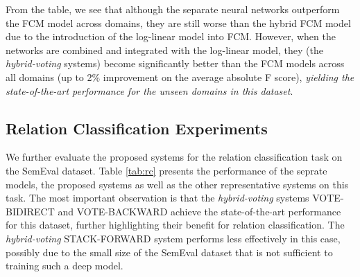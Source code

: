 \documentclass[11pt,letterpaper]{article}
\begin{document}
From the table, we see that although the separate neural networks outperform the FCM model across domains, they are still worse than the hybrid FCM model due to the introduction of the log-linear model into FCM. However, when the networks are combined and integrated with the log-linear model, they (the {\it hybrid-voting} systems) become significantly better than the FCM models across all domains (up to 2\% improvement on the average absolute F score), {\it yielding the state-of-the-art performance for the unseen domains in this dataset}.



\begin{comment}
\begin{table}[htbp]
\small
\centering
\resizebox{.5\textwidth}{!}{
\begin{tabular}{|l|c|c|c|c|c|c|}
\hline
 & bc &  & cts &  & wl &  \\ \hline
 & CNN & RNN & CNN & RNN & CNN & RNN \\ \hline
PHYS & 41.9 & 48.9 & 35.1 & 42.7 & 33.1 & 40.4 \\ \hline
PART-WHOLE & 60.8 & 62.8 & 53.7 & 52.4 & 51.6 & 52.4 \\ \hline
ART & 61.7 & 60.9 & 64.9 & 70.6 & 51.4 & 53.3 \\ \hline
ORG-AFF & 79 & 78.8 & 62.4 & 64.7 & 59.6 & 57.6 \\ \hline
PER-SOC & 74.7 & 72.7 & 69.6 & 70.4 & 58.8 & 60.5 \\ \hline
GEN-AFF & 53.1 & 50.8 & 38.7 & 28.3 & 51.1 & 53.7 \\ \hline
all & 63.3 & 63.1 & 55.6 & 56.5 & 53.9 & 53.6 \\ \hline
\end{tabular}
}
\label{}
\caption{}
\end{table}
\end{comment}

\subsection{Relation Classification Experiments}


We further evaluate the proposed systems for the relation classification task on the SemEval dataset. Table \ref{tab:rc} presents the performance of the seprate models, the proposed systems as well as the other representative systems on this task. The most important observation is that the {\it hybrid-voting} systems VOTE-BIDIRECT  and VOTE-BACKWARD achieve the state-of-the-art performance for this dataset, further highlighting their benefit for relation classification. The {\it hybrid-voting} STACK-FORWARD system performs less effectively in this case, possibly due to the small size of the SemEval dataset that is not sufficient to training such a deep model.
\end{document}
